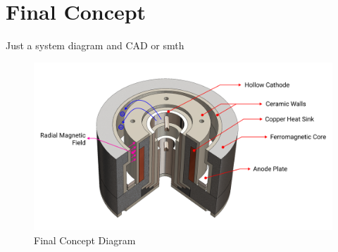 \section{Final Concept}

Just a system diagram and CAD or smth

\begin{figure}[H]
    \centering
    \includegraphics[width=1.0\textwidth]{images/Concepts/final concept.png}
    \captionsetup{justification=centering}
    \caption{Final Concept Diagram}
    \label{fig:final_concept}
\end{figure}